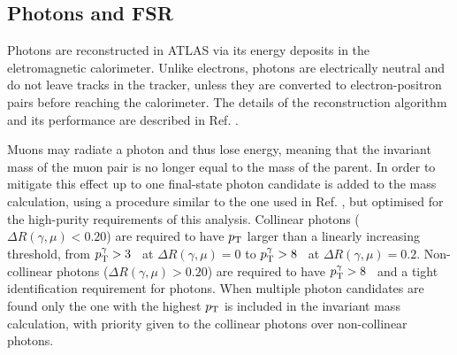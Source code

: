 \subsection{Photons and FSR}

Photons are reconstructed in ATLAS via its energy deposits
in the eletromagnetic calorimeter. Unlike electrons, photons
are electrically neutral and do not leave tracks in the
tracker, unless they are converted to electron-positron
pairs before reaching the calorimeter. The details of the
reconstruction algorithm and its performance are described
in Ref. \cite{Aaboud:2018yqu}.

Muons may radiate a photon and thus lose energy, meaning that
the invariant mass of the muon pair is no longer equal to the
mass of the parent. In order to mitigate this effect up to
one final-state photon candidate is added to the mass
calculation, using a procedure similar to the one used in
Ref. \cite{Aad:2014eva}, but optimised for the high-purity
requirements of this analysis. Collinear photons
($\Delta R(\gamma, \mu) < 0.20$) are required to have $p_{\text{T}}$
larger than a linearly increasing threshold, from
$p_{\text{T}}^\gamma > 3$ \GeV~at $\Delta R(\gamma, \mu) = 0$ to
$p_{\text{T}}^\gamma > 8$ \GeV~at $\Delta R(\gamma, \mu) = 0.2$.
Non-collinear photons ($\Delta R(\gamma, \mu) > 0.20$)
are required to have $p_{\text{T}}^\gamma > 8$ \GeV~and a tight \cite{Aaboud:2018yqu}
identification requirement for photons. When multiple
photon candidates are found only the one with the highest $p_{\text{T}}$
is included in the invariant mass calculation, with priority given
to the collinear photons over non-collinear photons.

